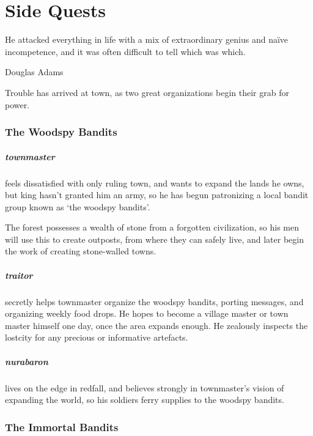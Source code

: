 \chapter{Side Quests}
  \epigraph{He attacked everything in life with a mix of extraordinary genius and na\"ive incompetence, and it was often difficult to tell which was which.}{Douglas Adams}
\label{sideQuestIntro}

\begin{multicols}{2}

\noindent
Trouble has arrived at \gls{town}, as two great organizations begin their grab for power.

\subsection{The Woodspy Bandits}

\paragraph{\gls{townmaster}} feels dissatisfied with only ruling \gls{town}, and wants to expand the lands he owns, but \gls{king} hasn't granted him an army, so he has begun patronizing a local bandit group known as `the woodspy bandits'.

The forest possesses a wealth of stone from a forgotten civilization, so his men will use this to create outposts, from where they can safely live, and later begin the work of creating stone-walled towns.

\paragraph{\gls{traitor}}
secretly helps \gls{townmaster} organize the woodspy bandits, porting messages, and organizing weekly food drops.
He hopes to become a village master or town master himself one day, once the area expands enough.
He zealously inspects the \gls{lostcity} for any precious or informative artefacts.

\paragraph{\Gls{nurabaron}}
lives on the \gls{edge} in \gls{redfall}, and believes strongly in \gls{townmaster}'s vision of expanding the world, so his soldiers ferry supplies to the woodspy bandits.

\subsection{The Immortal Bandits}


\end{multicols}
